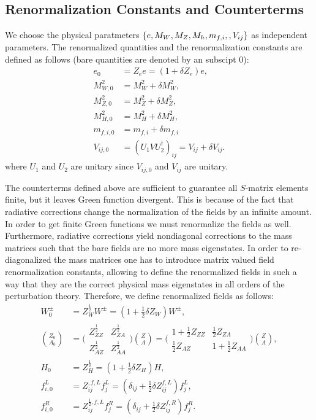 \subsection{Renormalization Constants and Counterterms}

We choose the physical paratmeters $\{e, M_W, M_Z, M_h, m_{f,i},\newline , V_{ij} \}$ as independent parameters. The renormalized quantities and the renormalization constants are defined as follows (bare quantities are denoted by an subscipt $0$):
\begin{align}
e_0&=Z_e e=(1+\delta Z_e)e,\nonumber\\
M^2_{W,0}&=M^2_W+\delta M^2_W,\nonumber\\
M^2_{Z,0}&=M^2_Z+\delta M^2_Z,\nonumber\\
M^2_{H,0}&=M^2_H+\delta M^2_H,\nonumber\\
m_{f,i,0}&=m_{f,i}+\delta m_{f,i}\nonumber\\
V_{ij,0}&=(U_1 V U_2^\dagger)_{ij}=V_{ij}+\delta V_{ij}.
\end{align}
where $U_1$ and $U_2$ are unitary since $V_{ij,0}$ and $V_{ij}$ are unitary.

The counterterms defined above are sufficient to guarantee all $S$-matrix elements finite, but it leaves Green function divergent. This is because of the fact that radiative corrections change the normalization of the fields by an infinite amount. In order to get finite Green functions we must renormalize the fields as well. Furthermore, radiative corrections yield nondiagonal corrections to the mass matrices such that the bare fields are no more mass eigenstates. In order to re-diagonalized the mass matrices one has to introduce matrix valued field renormalization constants, allowing to define the renormalized fields in such a way that they are the correct physical mass eigenstates in all orders of the perturbation theory. Therefore, we define renormalized fields as follows:
\begin{align}
W_0^\pm&=Z^{\frac{1}{2}}_W W^\pm = (1+\frac{1}{2}\delta Z_W)W^\pm
,\nonumber\\
\binom{Z_0}{A_0}&=\bigg(
\begin{array}{cc}
Z^\frac{1}{2}_{ZZ} & Z^\frac{1}{2}_{ZA}\\
Z^\frac{1}{2}_{AZ} & Z^\frac{1}{2}_{AA}   
\end{array}
\bigg
)\binom{Z}{A}
=\bigg(
\begin{array}{cc}
1+\frac{1}{2} Z_{ZZ} & \frac{1}{2} Z_{ZA}\\
\frac{1}{2}Z_{AZ} & 1+\frac{1}{2}Z_{AA}   
\end{array}
\bigg
)\binom{Z}{A},\nonumber\\
H_0&=Z^\frac{1}{2}_H=(1+\frac{1}{2}\delta Z_H)H,\nonumber\\
f^L_{i,0}&=Z^{,f,L}_{ij}f^L_j=(\delta_{ij}+\frac{1}{2}\delta Z^{f,L}_{ij})f^L_j,\nonumber\\
f^R_{i,0}&=Z^{\frac{1}{2},f,L}_{ij}f^R_j=(\delta_{ij}+\frac{1}{2}\delta Z^{f,R}_{ij})f^R_j.
\end{align}

